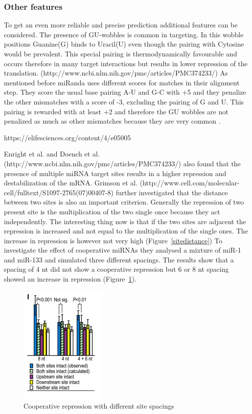 \documentclass[12pt]{article}
\begin{document}
\subsubsection{Other features}
To get an even more reliable and precise prediction additional features can be considered. The presence of GU-wobbles is common in targeting. In this wobble positions Guanine(G) binds to Uracil(U) even though the pairing with Cytosine would be prevalent. This special pairing is thermodynamically favourable and occurs therefore in many target interactions but results in lower repression of the translation. (http://www.ncbi.nlm.nih.gov/pmc/articles/PMC374233/) As mentioned before miRanda uses different scores for matches in their alignment step. They score the usual base pairing A-U and G-C with +5 and they penalize the other mismatches with a score of -3, excluding the pairing of G and U. This pairing is rewarded with at least +2 and therefore the GU wobbles are not penalized as much as other mismatches because they are very common \cite{Enright}.
 
https://elifesciences.org/content/4/e05005

Enright et al. \cite{Enright} and Doench et al. \cite{Doench} (http://www.ncbi.nlm.nih.gov/pmc/articles/PMC374233/)  also found that the presence of multiple miRNA target sites results in a higher repression and destabilization of the mRNA. Grimson et al. \cite{Grimson} (http://www.cell.com/molecular-cell/fulltext/S1097-2765(07)00407-8) further investigated that the distance between two sites is also an important criterion. Generally the repression of two present site is the multiplication of the two single once because they act independently. The interesting thing now is that if the two sites are adjacent the repression is increased and not equal to the multiplication of the single ones. The increase in repression is however not very high (Figure~\ref{sitedistance}) To investigate the effect of cooperative miRNAs they analysed a mixture of miR-1 and miR-133 and simulated three different spacings. The results show that a spacing of 4 nt did not show a cooperative repression but 6 or 8 nt spacing showed an increase in repression (Figure~\ref{sitespacing}).\\

\begin{figure}
\centering
\includegraphics[scale=1.2]{results/sites_8nt.PNG}  
\caption{Cooperative repression with different site spacings}
\label{sitespacing}
\end{figure}
\end{document}
